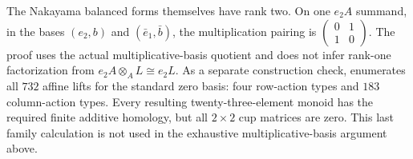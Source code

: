 \begin{remark}\label{B:Nakayama-two-by-five-rank-correction}
The Nakayama balanced forms themselves have rank two.  On one
$e_2A$ summand, in the bases $(e_2,b)$ and $(\bar e_1,\bar b)$,
the multiplication pairing is
$\left(\begin{smallmatrix}0&1\\1&0\end{smallmatrix}\right)$.
The proof uses the actual multiplicative-basis quotient and
does not infer rank-one factorization from
$e_2A\otimes_A L\cong e_2L$.
As a separate construction check,
 enumerates all $732$
affine lifts for the standard zero basis: four row-action
types and $183$ column-action types.  Every resulting
twenty-three-element monoid has the required finite additive
homology, but all $2\times2$ cup matrices are zero.  This
last family calculation is not used in the exhaustive
multiplicative-basis argument above.
\end{remark}
